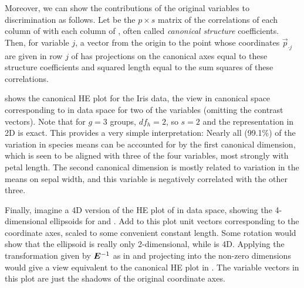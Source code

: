 Moreover, we can show the contributions of the original variables to discrimination
as follows.  Let  be the $p \times s$ matrix of the correlations of
each column of  with each column of , often called
\emph{canonical structure} coefficients. 
Then, for variable $j$, a
vector from the origin
to the point whose coordinates $\vec{p}_{\cdot j}$ are given in row $j$ of 
has projections on the canonical axes equal to these structure coefficients
and squared length equal to the sum squares of these correlations.

 shows the canonical HE plot for the Iris data, the
view in canonical space corresponding to  in data space
for two of the variables (omitting the contrast vectors).
Note that for $g=3$ groups, $df_h=2$, so $s=2$ and the representation in 2D is exact.
This provides a very simple interpretation:  Nearly all (99.1\%) 
of the variation in species means can be accounted for by the first canonical dimension,
which is seen to be aligned with three of the four variables, most strongly with
petal length.  The second canonical dimension is mostly related to variation in the
means on sepal width, and this variable is negatively correlated with the
other three.

Finally, imagine a 4D version of the HE plot of  in data space,
showing the 4-dimensional ellipsoids for  and .  Add to this plot 
unit vectors corresponding to the coordinate axes, scaled to some convenient constant length.
Some rotation would
show that the  
ellipsoid is really only 2-dimensional, while  is 4D.
Applying the transformation given by $\bm{\bm{E}}^{-1}$ as in 
and projecting into the non-zero dimensions would give a view equivalent to the
canonical HE plot in .  
The variable vectors in this plot are just the shadows of the original coordinate axes.


